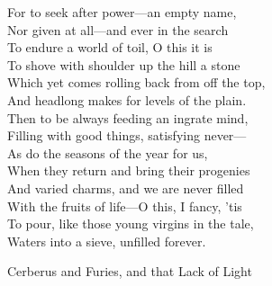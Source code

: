 For to seek after power—an empty name,\\
Nor given at all—and ever in the search\\
To endure a world of toil, O this it is\\
To shove with shoulder up the hill a stone\\
Which yet comes rolling back from off the top,\\
And headlong makes for levels of the plain.\\
Then to be always feeding an ingrate mind,\\
Filling with good things, satisfying never—\\
As do the seasons of the year for us,\\
When they return and bring their progenies\\
And varied charms, and we are never filled\\
With the fruits of life—O this, I fancy, 'tis\\
To pour, like those young virgins in the tale,\\
Waters into a sieve, unfilled forever.

Cerberus and Furies, and that Lack of Light

